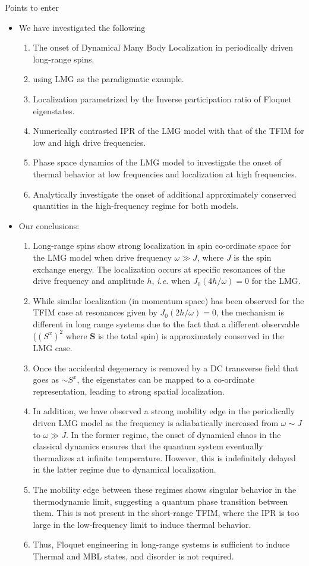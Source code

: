 \documentclass{article}
\begin{document}
Points to enter
\begin{itemize}
	\item We have investigated the following
	\begin{enumerate}
		\item The onset of Dynamical Many Body Localization in periodically driven long-range spins.
		\item  using LMG as the paradigmatic example.
		\item Localization parametrized by the Inverse participation ratio of Floquet eigenstates.
		\item Numerically contrasted IPR of the LMG model with that of the TFIM for low and high drive frequencies.
		\item Phase space dynamics of the LMG model to investigate the onset of thermal behavior at low frequencies and localization at high frequencies. 
		\item Analytically investigate the onset of additional approximately conserved quantities in the high-frequency regime for both models.
	\end{enumerate}
\item Our conclusions:
\begin{enumerate}
	\item Long-range spins show strong localization in spin co-ordinate space for the LMG model when drive frequency $\omega \gg J$, where $J$ is the spin exchange energy. The localization occurs at specific resonances of the drive frequency and amplitude $h$, \textit{i.e.} when  $J_0(4h/\omega)=0$ for the LMG. 
	\item While similar localization (in momentum space) has been observed for the TFIM case at resonances given by $J_0(2h/\omega)=0$, the mechanism is different in long range systems due to the fact that a different observable ($(S^x)^2$ where $\mathbf{S}$ is the total spin) is approximately conserved in the LMG case.
	\item Once the accidental degeneracy is removed by a DC transverse field that goes as $\sim S^x$, the eigenstates can be mapped to a co-ordinate representation, leading to strong spatial localization.
	\item In addition, we have observed a strong mobility edge in the periodically driven LMG model as the frequency is adiabatically increased from $\omega \sim J$ to $\omega \gg J$. In the former regime, the onset of  dynamical chaos in the classical dynamics ensures that the quantum system eventually thermalizes at infinite temperature. However, this is indefinitely delayed in the latter regime due to dynamical localization.
	\item 
	The mobility edge between these regimes shows singular behavior in the thermodynamic limit, suggesting a quantum phase transition between them. This is not present in the short-range TFIM, where the IPR is too large in the low-frequency limit to induce thermal behavior.
	\item Thus, Floquet engineering in long-range systems is sufficient to induce Thermal and MBL states, and disorder is not required. 
\end{enumerate}


\end{itemize}
\end{document}
